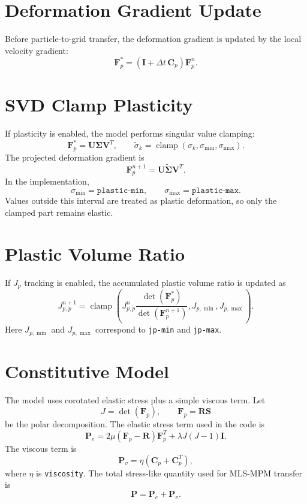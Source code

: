 \documentclass[11pt,a4paper]{article}
\begin{document}
\section{Deformation Gradient Update}

Before particle-to-grid transfer, the deformation gradient is updated by the
local velocity gradient:
\[
  \bm{F}_p^{*} =
  \left(\bm{I}+\Delta t\,\bm{C}_p\right)\bm{F}_p^n .
\]

\section{SVD Clamp Plasticity}

If plasticity is enabled, the model performs singular value clamping:
\[
  \bm{F}_p^{*} = \bm{U}\bm{\Sigma}\bm{V}^T,
  \qquad
  \tilde{\sigma}_k =
  \operatorname{clamp}(\sigma_k,\sigma_{\min},\sigma_{\max}) .
\]
The projected deformation gradient is
\[
  \bm{F}_p^{n+1} =
  \bm{U}\tilde{\bm{\Sigma}}\bm{V}^T .
\]
In the implementation,
\[
  \sigma_{\min}=\texttt{plastic-min},
  \qquad
  \sigma_{\max}=\texttt{plastic-max}.
\]
Values outside this interval are treated as plastic deformation, so only the
clamped part remains elastic.

\section{Plastic Volume Ratio}

If $J_p$ tracking is enabled, the accumulated plastic volume ratio is updated as
\[
  J_{p,p}^{n+1} =
  \operatorname{clamp}
  \left(
    J_{p,p}^{n}
    \frac{\det(\bm{F}_p^{*})}{\det(\bm{F}_p^{n+1})},
    J_{p,\min},
    J_{p,\max}
  \right).
\]
Here $J_{p,\min}$ and $J_{p,\max}$ correspond to \texttt{jp-min} and
\texttt{jp-max}.

\section{Constitutive Model}

The model uses corotated elastic stress plus a simple viscous term. Let
\[
  J = \det(\bm{F}_p),
  \qquad
  \bm{F}_p = \bm{R}\bm{S}
\]
be the polar decomposition. The elastic stress term used in the code is
\[
  \bm{P}_e =
  2\mu(\bm{F}_p-\bm{R})\bm{F}_p^T
  +
  \lambda J(J-1)\bm{I}.
\]
The viscous term is
\[
  \bm{P}_v =
  \eta(\bm{C}_p+\bm{C}_p^T),
\]
where $\eta$ is \texttt{viscosity}. The total stress-like quantity used for
MLS-MPM transfer is
\[
  \bm{P} = \bm{P}_e + \bm{P}_v .
\]
\end{document}
